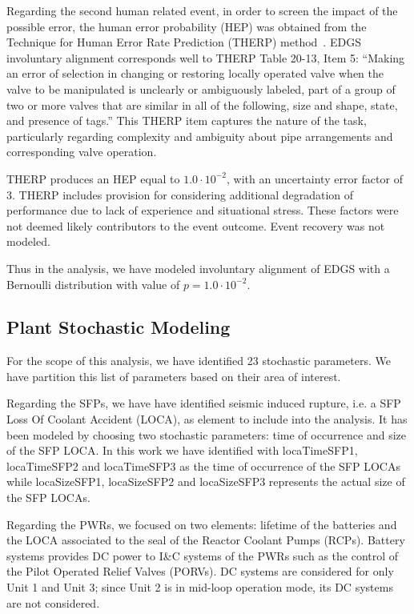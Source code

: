 Regarding the second human related event, in order to screen the impact of the possible error, 
the human error probability 
(HEP) was obtained from the Technique for Human Error Rate Prediction (THERP) 
method~\cite{NUREGCR1278}. 
EDGS involuntary alignment corresponds well to THERP Table 20-13, Item 5: ``Making an error 
of selection in changing or restoring locally operated valve when the valve to be manipulated 
is unclearly or ambiguously labeled, part of a group of two or more valves that are similar in 
all of the following, size and shape, state, and presence of tags.'' This THERP item captures 
the nature of the task, particularly regarding complexity and ambiguity about pipe arrangements 
and corresponding valve operation. 

THERP produces an HEP equal to $1.0 \cdot 10^{-2}$, with an uncertainty 
error factor of 3. THERP includes provision for considering additional degradation of performance 
due to lack of experience and situational stress. These factors were not deemed likely contributors 
to the event outcome. Event recovery was not modeled.

Thus in the analysis, we have modeled involuntary alignment of EDGS with a Bernoulli 
distribution with value of $p=1.0 \cdot 10^{-2}$.

\subsection{Plant Stochastic Modeling}
\label{sec:plantStochasticModeling}
For the scope of this analysis, we have identified 23 stochastic parameters. We have 
partition this list of parameters based on their area of interest.

Regarding the SFPs, we have have identified seismic induced rupture, i.e. a SFP Loss Of
Coolant Accident (LOCA), as 
element to include into the analysis. It has been modeled by choosing two stochastic 
parameters: time of  occurrence and size of the SFP LOCA. In this work we have identified 
with locaTimeSFP1, locaTimeSFP2 and locaTimeSFP3 as the time of occurrence of the SFP 
LOCAs while locaSizeSFP1, locaSizeSFP2 and locaSizeSFP3 represents the actual size of 
the SFP LOCAs.

Regarding the PWRs, we focused on two elements: lifetime of the batteries and the LOCA 
associated to the seal of the Reactor Coolant Pumps (RCPs). Battery systems provides 
DC power to I\&C systems 
of the PWRs such as the control of the Pilot Operated Relief Valves (PORVs).
DC systems are considered for only 
Unit 1 and Unit 3; since Unit 2 is in mid-loop operation mode, its DC systems are not 
considered.

